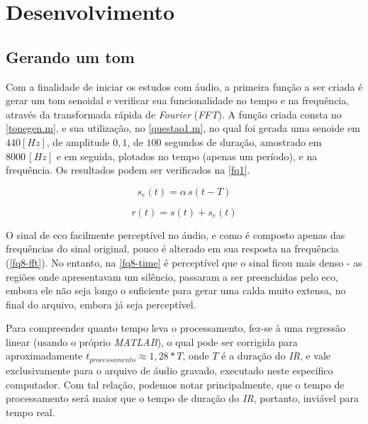 \section[Desenvolvimento]{Desenvolvimento}
	
	\subsection{Gerando um tom}
	
	Com a finalidade de iniciar os estudos com áudio, a primeira função a ser criada é gerar um tom senoidal e verificar sua funcionalidade no tempo e na frequência, através da transformada rápida de \textit{Fourier} (\textit{FFT}). A função criada consta no \autoref{tonegen.m}, e sua utilização, no \autoref{questao1.m}, no qual foi gerada uma senoide em $440 [Hz]$, de amplitude $0,1$, de $100$ segundos de duração, amostrado em $8000\,[Hz]$ e em seguida, plotados no tempo (apenas um período), e na frequência. Os resultados podem ser verificados na \autoref{fq1}.
	
	\begin{equation}
	\label{eq-eco1}
	s_e(t)=\alpha\,s(t -T)
	\end{equation}
	
	\begin{equation}
	\label{eq-eco2}
	r(t)=s(t)+s_e(t)
	\end{equation}
	
	O sinal de eco facilmente perceptível no áudio, e como é composto apenas das frequências do sinal original, pouco é alterado em sua resposta na frequência (\autoref{fq8-fft}). No entanto, na \autoref{fq8-time} é perceptível que o sinal ficou mais denso - as regiões onde apresentavam um silêncio, passaram a ser preenchidas pelo eco, embora ele não seja longo o suficiente para gerar uma calda muito extensa, no final do arquivo, embora já seja perceptível.
	
		
	
	Para compreender quanto tempo leva o processamento, fez-se à uma regressão linear (usando o próprio \textit{MATLAB}), o qual pode ser corrigida para aproximadamente $t_{processamento} \approx 1,28*T$, onde $T$ é a duração do \textit{IR}, e vale exclusivamente para o arquivo de áudio gravado, executado neste específico computador. Com tal relação, podemos notar principalmente, que o tempo de processamento será maior que o tempo de duração do \textit{IR}, portanto, inviável para tempo real.